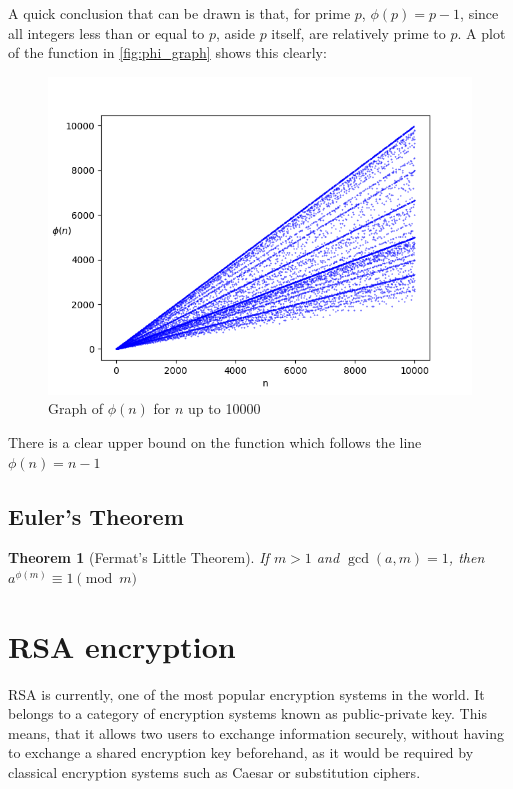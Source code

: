 \documentclass[12pt, titlepage]{article}
\newtheorem{theorem}{Theorem}
\begin{document}
    A quick conclusion that can be drawn is that, for prime $p$, $\phi(p) = p - 1$, since
    all integers less than or equal to $p$, aside $p$ itself, are relatively prime to $p$. A
    plot of the function in \autoref{fig:phi_graph} shows this clearly:
    \begin{figure}[H]
        \centering
        \includegraphics[width=\textwidth]{phi_10000}
        \caption{Graph of $\phi(n)$ for $n$ up to 10000}
        \label{fig:phi_graph}
    \end{figure}
    There is a clear upper bound on the function which follows the line $\phi(n) = n-1$

    \subsection{Euler's Theorem}
    \begin{theorem}[Fermat's Little Theorem]
        If $m>1$ and $\gcd(a, m) = 1$, then $a^{\phi(m)} \equiv 1 \pmod m$
    \end{theorem}

\section{RSA encryption}
RSA \autocite{rsa} is currently, one of the most popular encryption systems in the world.  It
belongs to a category of encryption systems known as public-private key.  This means, that
it allows two users to exchange information securely, without having to exchange a shared
encryption key beforehand, as it would be required by classical encryption systems such as
Caesar or substitution ciphers. 
\end{document}

